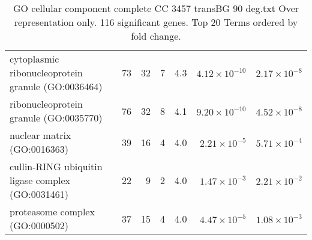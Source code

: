 \begin{table}[ht]
\begin{adjustbox}{width=\textwidth}
\begin{tabular}{lrrrrrr}
  cytoplasmic ribonucleoprotein granule (GO:0036464) & 73 & 32 & 7 & 4.3 & $4.12 \times 10^{-10}$ & $2.17 \times 10^{-8}$ \\ 
  ribonucleoprotein granule (GO:0035770) & 76 & 32 & 8 & 4.1 & $9.20 \times 10^{-10}$ & $4.52 \times 10^{-8}$ \\ 
  nuclear matrix (GO:0016363) & 39 & 16 & 4 & 4.0 & $2.21 \times 10^{-5}$ & $5.71 \times 10^{-4}$ \\ 
  cullin-RING ubiquitin ligase complex (GO:0031461) & 22 & 9 & 2 & 4.0 & $1.47 \times 10^{-3}$ & $2.21 \times 10^{-2}$ \\ 
  proteasome complex (GO:0000502) & 37 & 15 & 4 & 4.0 & $4.47 \times 10^{-5}$ & $1.08 \times 10^{-3}$ \\ 
   \hline
\end{tabular}
\end{adjustbox}
\caption{GO cellular component complete CC 3457 transBG 90 deg.txt Over representation only. 116 significant genes. Top 20 Terms ordered by fold change. } 
\label{tab:GO cellular component complete CC 3457 transBG 90 deg.txt Over representation only. 116 significant genes. Top 20 Terms ordered by fold change. }
\end{table}

